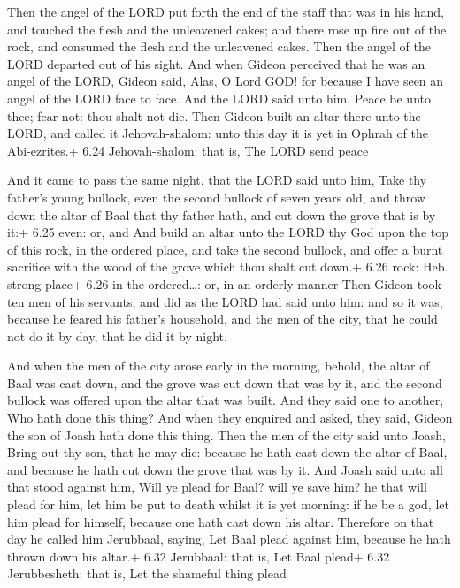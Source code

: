  Then the angel of the LORD put forth the end of the
staff that was in his hand, and touched the flesh and the unleavened
cakes; and there rose up fire out of the rock, and consumed the flesh
and the unleavened cakes. Then the angel of the LORD departed out of his
sight.  And when Gideon perceived that he was an angel of
the LORD, Gideon said, Alas, O Lord GOD! for because I have seen an
angel of the LORD face to face.  And the LORD said unto
him, Peace be unto thee; fear not: thou shalt not die. 
Then Gideon built an altar there unto the LORD, and called it
Jehovah-shalom: unto this day it is yet in Ophrah of the Abi-ezrites.+
6.24 Jehovah-shalom: that is, The LORD send peace

 And it came to pass the same night, that the LORD said
unto him, Take thy father's young bullock, even the second bullock of
seven years old, and throw down the altar of Baal that thy father hath,
and cut down the grove that is by it:+ 6.25 even: or, and 
And build an altar unto the LORD thy God upon the top of this rock, in
the ordered place, and take the second bullock, and offer a burnt
sacrifice with the wood of the grove which thou shalt cut down.+ 6.26
rock: Heb. strong place+ 6.26 in the ordered\ldots: or, in an orderly
manner  Then Gideon took ten men of his servants, and did
as the LORD had said unto him: and so it was, because he feared his
father's household, and the men of the city, that he could not do it by
day, that he did it by night.

 And when the men of the city arose early in the morning,
behold, the altar of Baal was cast down, and the grove was cut down that
was by it, and the second bullock was offered upon the altar that was
built.  And they said one to another, Who hath done this
thing? And when they enquired and asked, they said, Gideon the son of
Joash hath done this thing.  Then the men of the city said
unto Joash, Bring out thy son, that he may die: because he hath cast
down the altar of Baal, and because he hath cut down the grove that was
by it.  And Joash said unto all that stood against him,
Will ye plead for Baal? will ye save him? he that will plead for him,
let him be put to death whilst it is yet morning: if he be a god, let
him plead for himself, because one hath cast down his altar.
 Therefore on that day he called him Jerubbaal, saying, Let
Baal plead against him, because he hath thrown down his altar.+ 6.32
Jerubbaal: that is, Let Baal plead+ 6.32 Jerubbesheth: that is, Let the
shameful thing plead

